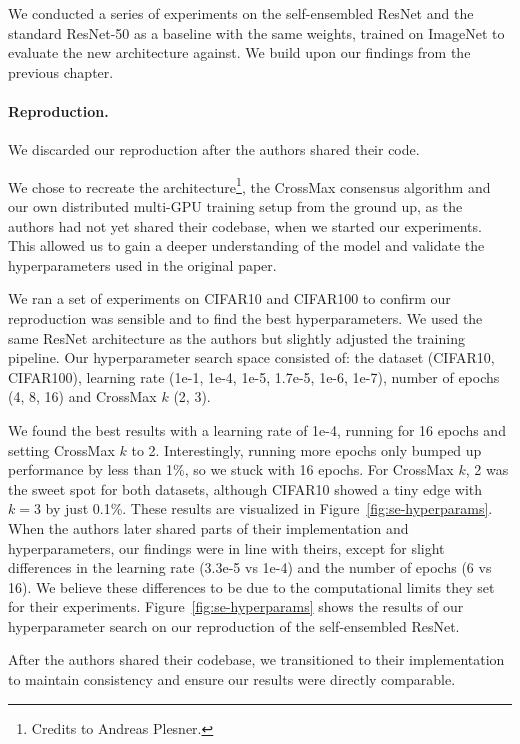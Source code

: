 \documentclass[a4paper, oneside]{discothesis}
\begin{document}
We conducted a series of experiments on the self-ensembled ResNet and the standard ResNet-50 as a baseline with the same weights, trained on ImageNet to evaluate the new architecture against. We build upon our findings from the previous chapter.

\paragraph{Reproduction.}

We discarded our reproduction after the authors shared their code.

We chose to recreate the architecture\footnote{Credits to Andreas Plesner.}, the CrossMax consensus algorithm and our own distributed multi-GPU training setup from the ground up, as the authors had not yet shared their codebase, when we started our experiments. This allowed us to gain a deeper understanding of the model and validate the hyperparameters used in the original paper.

We ran a set of experiments on CIFAR10 and CIFAR100 to confirm our reproduction was sensible and to find the best hyperparameters. We used the same ResNet architecture as the authors but slightly adjusted the training pipeline. Our hyperparameter search space consisted of: the dataset (CIFAR10, CIFAR100), learning rate (1e-1, 1e-4, 1e-5, 1.7e-5, 1e-6, 1e-7), number of epochs (4, 8, 16) and CrossMax $k$ (2, 3).

We found the best results with a learning rate of 1e-4, running for 16 epochs and setting CrossMax $k$ to 2. Interestingly, running more epochs only bumped up performance by less than 1\%, so we stuck with 16 epochs. For CrossMax $k$, 2 was the sweet spot for both datasets, although CIFAR10 showed a tiny edge with $k=3$ by just 0.1\%. These results are visualized in Figure~\ref{fig:se-hyperparams}. When the authors later shared parts of their implementation and hyperparameters, our findings were in line with theirs, except for slight differences in the learning rate (3.3e-5 vs 1e-4) and the number of epochs (6 vs 16). We believe these differences to be due to the computational limits they set for their experiments. Figure~\ref{fig:se-hyperparams} shows the results of our hyperparameter search on our reproduction of the self-ensembled ResNet.

After the authors shared their codebase, we transitioned to their implementation to maintain consistency and ensure our results were directly comparable.
\end{document}

